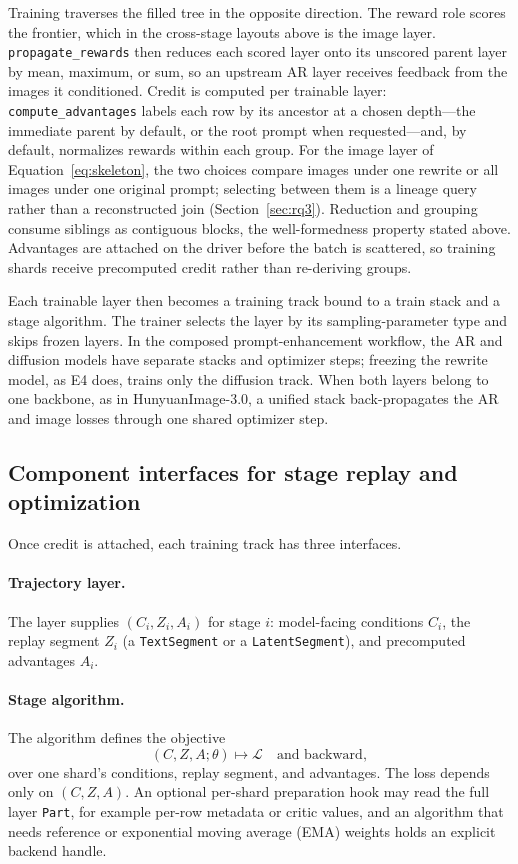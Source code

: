 \documentclass[10pt]{article}
\newcommand{\parttype}{\texttt{Part}}
\begin{document}
Training traverses the filled tree in the opposite direction.
The reward role scores the frontier, which in the cross-stage layouts above is the image layer.
\texttt{propagate\_rewards} then reduces each scored layer onto its unscored parent layer by mean, maximum, or sum, so an upstream AR layer receives feedback from the images it conditioned.
Credit is computed per trainable layer: \texttt{compute\_advantages} labels each row by its ancestor at a chosen depth---the immediate parent by default, or the root prompt when requested---and, by default, normalizes rewards within each group.
For the image layer of Equation~\ref{eq:skeleton}, the two choices compare images under one rewrite or all images under one original prompt; selecting between them is a lineage query rather than a reconstructed join (Section~\ref{sec:rq3}).
Reduction and grouping consume siblings as contiguous blocks, the well-formedness property stated above.
Advantages are attached on the driver before the batch is scattered, so training shards receive precomputed credit rather than re-deriving groups.

Each trainable layer then becomes a training track bound to a train stack and a stage algorithm.
The trainer selects the layer by its sampling-parameter type and skips frozen layers.
In the composed prompt-enhancement workflow, the AR and diffusion models have separate stacks and optimizer steps; freezing the rewrite model, as E4 does, trains only the diffusion track.
When both layers belong to one backbone, as in HunyuanImage-3.0, a unified stack back-propagates the AR and image losses through one shared optimizer step.

\subsection{Component interfaces for stage replay and optimization}
\label{sec:algorithm-boundary}

Once credit is attached, each training track has three interfaces.

\paragraph{Trajectory layer.}
The layer supplies $(C_i, Z_i, A_i)$ for stage $i$: model-facing conditions $C_i$, the replay segment $Z_i$ (a \texttt{TextSegment} or a \texttt{LatentSegment}), and precomputed advantages $A_i$.

\paragraph{Stage algorithm.}
The algorithm defines the objective
\begin{equation}
(C,Z,A;\theta) \longmapsto \mathcal{L}\quad\text{and backward},
\label{eq:algorithm}
\end{equation}
over one shard's conditions, replay segment, and advantages.
The loss depends only on $(C,Z,A)$.
An optional per-shard preparation hook may read the full layer \parttype{}, for example per-row metadata or critic values, and an algorithm that needs reference or exponential moving average (EMA) weights holds an explicit backend handle.
\end{document}
